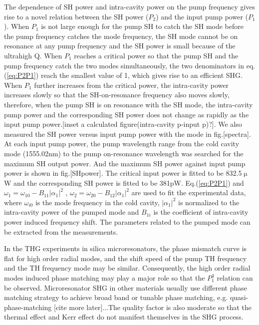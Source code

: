 \documentclass[a4paper,12pt,hyperref]{article}
\begin{document}
The dependence of SH power and intra-cavity power on the pump frequency gives rise to a novel relation between the SH power ($P_2$) and the input pump power ($P_1$). When $P_1$ is not large enough for the pump SH to catch the SH mode before the pump frequency catches the mode frequency, the SH mode cannot be on resonance at any pump frequency and the SH power is small because of the ultrahigh Q. When $P_1$ reaches a critical power so that the pump SH and the pump frequency catch the two modes simultaneously, the two denominators in eq.(\ref{eq:P2P1}) reach the smallest value of 1, which gives rise to an efficient SHG. When $P_1$ further increases from the critical power, the intra-cavity power increases slowly so that the SH-on-resonance frequency also moves slowly, therefore, when the pump SH is on resonance with the SH mode, the intra-cavity pump power and the corresponding SH power does not change as rapidly as the input pump power.[inset a calculated figure(intra-cavity p-input p)?]. We also measured the SH power versus input pump power with the mode in fig.[spectra]. At each input pump power, the pump wavelength range from the cold cavity mode (1555.02nm) to the pump on-resonance wavelength was searched for the maximum SH output power. And the maximum SH power against input pump power is shown in fig.[SHpower]. The critical input power is fitted to be 832.5$\upmu$W and the corresponding SH power is fitted to be 381pW. Eq.(\ref{eq:P2P1}) and $\omega_1 = \omega_{10}-B_{11}|\alpha_1|^2$ \cite{carmon2004dynamical}, $\omega_2 = \omega_{20}-B_{12}|\alpha_1|^2$ are used to fit the experimental data, where $\omega_{i0}$ is the mode frequency in the cold cavity, $|\alpha_1|^2$ is normalized to the intra-cavity power of the pumped mode and $B_{1i}$ is the coefficient of intra-cavity power induced frequency shift. The parameters related to the pumped mode can be extracted from the measurements. 

In the THG experiments in silica microresonators\cite{carmon2007visible, farnesi2014optical}, the phase mismatch curve is flat for high order radial modes, and the shift speed of the pump TH frequency and the TH frequency mode may be similar. Consequently, the high order radial modes induced phase matching may play a major role so that the $P_1^3$ relation can be observed. Microresonator SHG in other materials usually use different phase matching strategy to achieve broad band or tunable phase matching, e.g. quasi-phase-matching [cite more later]...The quality factor is also moderate so that the thermal effect and Kerr effect do not manifest themselves in the SHG process.
\end{document}
